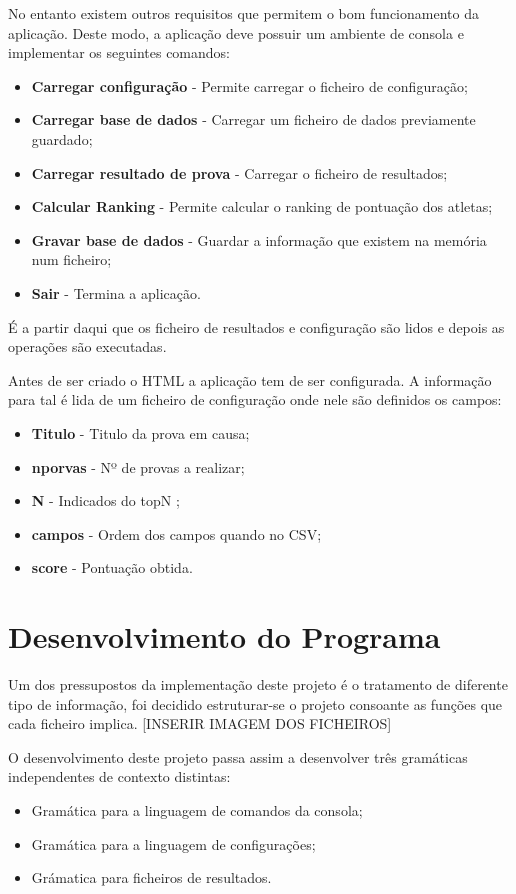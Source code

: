 \documentclass[11pt, a4paper, oneside]{article}
\begin{document}
No entanto existem outros requisitos que permitem o bom funcionamento da aplicação. Deste modo, a aplicação deve possuir um ambiente de consola e implementar os seguintes comandos:
\begin{itemize}
\item \textbf{Carregar configuração} - Permite carregar o ficheiro de configuração;
\item \textbf{Carregar base de dados} - Carregar um ficheiro de dados previamente guardado;
\item \textbf{Carregar resultado de prova} - Carregar o ficheiro de resultados;
\item \textbf{Calcular Ranking} - Permite calcular o ranking de pontuação dos atletas;
\item \textbf{Gravar base de dados} - Guardar a informação que existem na memória num ficheiro;
\item \textbf{Sair} - Termina a aplicação.
\end{itemize}

É a partir daqui que os ficheiro de resultados e configuração são lidos e depois as operações são executadas. 

Antes de ser criado o HTML a aplicação tem de ser configurada.
A informação para tal é lida de um ficheiro de configuração onde nele são definidos os campos:
\begin{itemize}
\item \textbf{Titulo} - Titulo da prova em causa;
\item \textbf{nporvas} - Nº de provas a realizar;
\item \textbf{N} - Indicados do topN ;
\item \textbf{campos} - Ordem dos campos quando no CSV;
\item \textbf{score} - Pontuação obtida.
\end{itemize}

\newpage

\section{Desenvolvimento do Programa}
Um dos pressupostos da implementação deste projeto é o tratamento de diferente tipo de informação, foi decidido estruturar-se o projeto consoante as funções que cada ficheiro implica.
[INSERIR IMAGEM DOS FICHEIROS]

O desenvolvimento deste projeto passa assim a desenvolver três gramáticas independentes de contexto distintas: 
\begin{itemize}
\item Gramática para a linguagem de comandos da consola; 
\item Gramática para a linguagem de configurações;
\item Grámatica para ficheiros de resultados. 
\end{itemize}
\end{document}
